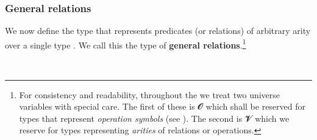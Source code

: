 \subsubsection{General relations}\label{general-relations}

We now define the type  that represents predicates (or relations) of arbitrary arity over a single type . We call this the type of \textbf{general relations}.\footnote{%
For consistency and readability, throughout the \ualib we treat two universe variables with special care. The first of these is 𝓞 which shall be reserved for types that represent
\emph{operation symbols} (see \ualibSignatures). The second is 𝓥 which we reserve for types representing \emph{arities} of relations or operations.}
\ccpad
\begin{code}%
\>[0]\AgdaSpace{}%
\AgdaSymbol{:}\AgdaSpace{}%
\AgdaSpace{}%
\AgdaSpace{}%
\AgdaSpace{}%
\AgdaSpace{}%
\AgdaSpace{}%
\AgdaSpace{}%
\AgdaSymbol{(}\AgdaSpace{}%
\AgdaSymbol{:}\AgdaSpace{}%
\AgdaSymbol{)}\AgdaSpace{}%
\AgdaSpace{}%
\AgdaSpace{}%
\AgdaSpace{}%
\AgdaSpace{}%
\AgdaSpace{}%
\AgdaSpace{}%
\AgdaSpace{}%
\<%
\\
\>[0]\AgdaSpace{}%
\AgdaSpace{}%
\AgdaSpace{}%
\AgdaSpace{}%
\AgdaSymbol{=}\AgdaSpace{}%
\AgdaSymbol{(}\AgdaSpace{}%
\AgdaSpace{}%
\AgdaSymbol{)}\AgdaSpace{}%
\AgdaSpace{}%
\AgdaSpace{}%
\<%
\end{code}

